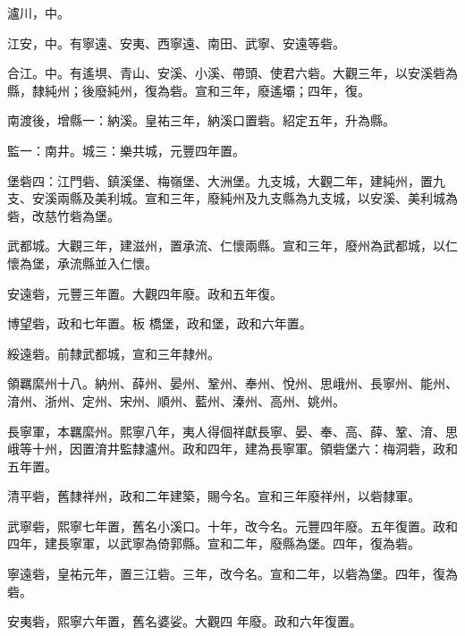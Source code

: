 \begin{pinyinscope}
 瀘川，中。



 江安，中。有寧遠、安夷、西寧遠、南田、武寧、安遠等砦。



 合江。中。有遙埧、青山、安溪、小溪、帶頭、使君六砦。大觀三年，以安溪砦為縣，隸純州；後廢純州，復為砦。宣和三年，廢遙壩；四年，復。



 南渡後，增縣一：納溪。皇祐三年，納溪口置砦。紹定五年，升為縣。



 監一：南井。城三：樂共城，元豐四年置。



 堡砦四：江門砦、鎮溪堡、梅嶺堡、大洲堡。九支城，大觀二年，建純州，置九支、安溪兩縣及美利城。宣和三年，廢純州及九支縣為九支城，以安溪、美利城為砦，改慈竹砦為堡。



 武都城。大觀三年，建滋州，置承流、仁懷兩縣。宣和三年，廢州為武都城，以仁懷為堡，承流縣並入仁懷。



 安遠砦，元豐三年置。大觀四年廢。政和五年復。



 博望砦，政和七年置。板
 橋堡，政和堡，政和六年置。



 綏遠砦。前隸武都城，宣和三年隸州。



 領羈縻州十八。納州、薛州、晏州、鞏州、奉州、悅州、思峨州、長寧州、能州、淯州、浙州、定州、宋州、順州、藍州、溱州、高州、姚州。



 長寧軍，本羈縻州。熙寧八年，夷人得個祥獻長寧、晏、奉、高、薛、鞏、淯、思峨等十州，因置淯井監隸瀘州。政和四年，建為長寧軍。領砦堡六：梅洞砦，政和五年置。



 清平砦，舊隸祥州，政和二年建築，賜今名。宣和三年廢祥州，以砦隸軍。



 武寧砦，熙寧七年置，舊名小溪口。十年，改今名。元豐四年廢。五年復置。政和四年，建長寧軍，以武寧為倚郭縣。宣和二年，廢縣為堡。四年，復為砦。



 寧遠砦，皇祐元年，置三江砦。三年，改今名。宣和二年，以砦為堡。四年，復為砦。



 安夷砦，熙寧六年置，舊名婆娑。大觀四
 年廢。政和六年復置。




\end{pinyinscope}
